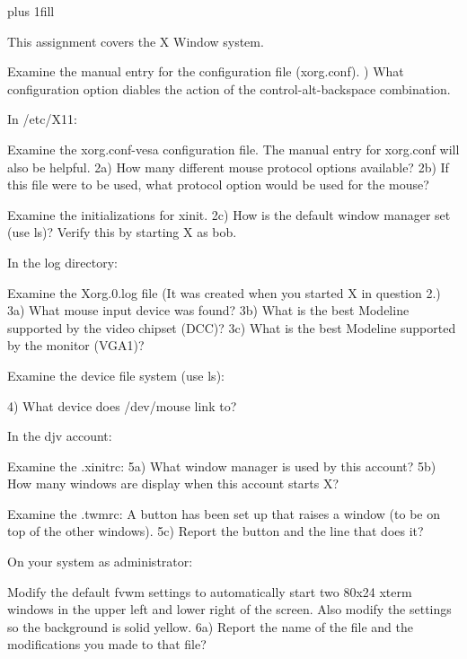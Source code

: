 
\rightskip=0pt plus 1fill

\parindent 0pt

This assignment covers the X Window system.

Examine the manual entry for the configuration file ({\ltt{}xorg.conf}).
\hfill{}) What configuration option diables the action of the control-alt-backspace
combination.

In {\ltt{}/etc/X11}:

Examine the {\ltt{}xorg.conf-vesa}  configuration file.
The manual entry for {\ltt{}xorg.conf} will also be helpful.
\hfill\break
2a) How many different mouse protocol options available?
\hfill\break
2b) If this file were to be used, what protocol option would be used for the
mouse?

Examine the initializations for {\ltt{}xinit}.
\hfill\break
2c) How is the default window manager set (use {\ltt{}ls})?
\hfill\break
Verify this by starting X as {\ltt{}bob}.

In the log directory:

Examine the {\ltt{}Xorg.0.log} file 
(It was created when you started X in question 2.)
\hfill\break
3a) What mouse input device was found?
\hfill\break
3b) What is the best Modeline supported by the video chipset (DCC)?
\hfill\break
3c) What is the best Modeline supported by the monitor (VGA1)?


Examine the device file system (use {\ltt{}ls}):

4) What device does {\ltt{}/dev/mouse} link to?

In the {\ltt{}djv} account:

Examine the {\ltt{}.xinitrc}:
\hfill\break
5a) What window manager is used by this account?
\hfill\break
5b) How many windows are display when this account starts X?

Examine the {\ltt{}.twmrc}:
\hfill\break
A button has been set up that raises a window (to be on
top of the other windows).
\hfill\break
5c) Report the button and the line that does it?

On your system as administrator:

Modify the default {\ltt{}fvwm} settings to automatically
start two 80x24 xterm windows in the upper left and lower right
of the screen. Also modify the settings so the background is
solid yellow.
\hfill\break
6a) Report the name of the file and the modifications you made
to that file?

